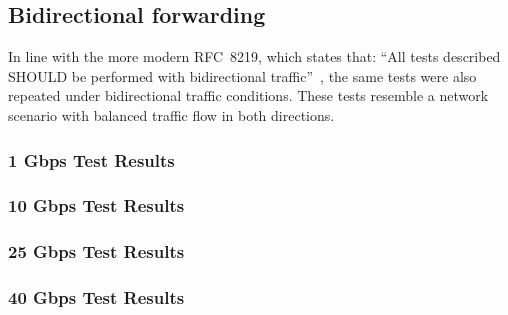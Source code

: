 \subsection{Bidirectional forwarding}

In line with the more modern RFC~8219, which states that: ``All tests described SHOULD be performed with bidirectional traffic''~\cite{RFC8219}, 
the same tests were also repeated under bidirectional traffic conditions. These tests resemble a network scenario with balanced traffic flow in both directions.

\subsubsection{1 Gbps Test Results}
\subsubsection{10 Gbps Test Results}
\subsubsection{25 Gbps Test Results}
\subsubsection{40 Gbps Test Results}


